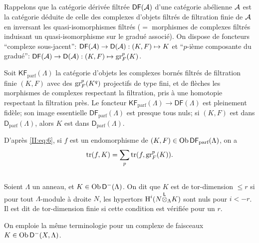 \documentclass[oneside]{book}
\begin{document}
\subsection{}\label{II:4-4}

Rappelons que la catégorie dérivée filtrée $\mathsf{DF}(\mathcal{A})$ d'une catégorie 
abélienne $\mathcal{A}$ est la catégorie déduite de celle des complexes d'objets 
filtrés de filtration finie de $\mathcal{A}$ en inversant les quasi-isomorphismes 
filtrés ($=$ morphismes de complexes filtrés induisant un quasi-isomorphisme 
sur le gradué associé). On dispose de foncteurs ``complexe sous-jacent'': 
$\mathsf{DF}(\mathcal{A})\to\mathsf{D}(\mathcal{A}): (K,F)\mapsto K$ et ``$p$-ième composante du 
gradué'': $\mathsf{DF}(\mathcal{A})\to\mathsf{D}(\mathcal{A}): (K,F)\mapsto \operatorname{gr}_F^p(K)$. 

Soit $\mathsf{KF}_\text{parf}(\Lambda)$ la catégorie d'objets les complexes 
bornés filtrés de filtration finie $(K,F)$ avec des $\operatorname{gr}_F^p(K^q)$ projectifs 
de type fini, et de flèches les morphismes de complexes respectant la 
filtration, pris à une homotopie respectant la filtration près. Le foncteur 
$\mathsf{KF}_\text{parf}(\Lambda)\to\mathsf{DF}(\Lambda)$ est pleinement fidèle; 
son image essentielle $\mathsf{DF}_\text{parf}(\Lambda)$ est presque tous nuls; 
si $(K,F)$ est dans $\mathsf{D}_\text{parf}(\Lambda)$, alors $K$ est dans 
$\mathsf{D}_\text{parf}(\Lambda)$. 

D'après \eqref{II:eq:6}, si $f$ est un endomorphisme de 
$(K,F)\in\operatorname{Ob}\mathsf{DF}_\text{parf}(\Lambda)$, on a 
\begin{equation}\label{II:eq:4-4-1}
 \operatorname{tr}(f,K) = \sum_p \operatorname{tr}(f,\operatorname{gr}_F^p(K)) \text{.}
\end{equation}





\subsection{}\label{II:4-5}

Soient $\Lambda$ un anneau, et $K\in\operatorname{Ob}\mathsf{D}^-(\Lambda)$. On dit que $K$ est de 
tor-dimension $\leqslant r$ si pour tout $\Lambda$-module à droite $N$, les 
hypertors $\operatorname{H}^i(N{\overset{\mathsf{L}}{\otimes}}_\Lambda K)$ sont nuls pour $i<-r$. Il est dit de 
tor-dimension finie si cette condition est vérifiée pour un $r$. 

On emploie la même terminologie pour un complexe de faisceaux 
$K\in\operatorname{Ob}\mathsf{D}^-(X,\Lambda)$. 
\end{document}
